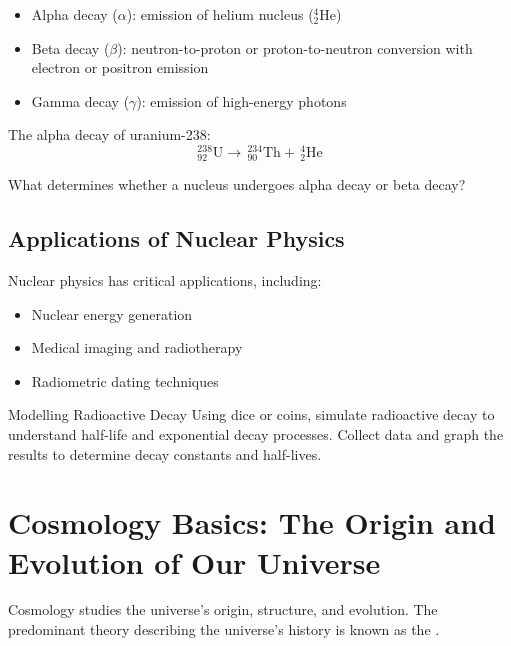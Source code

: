 \begin{itemize}
    \item Alpha decay ($\alpha$): emission of helium nucleus ($^4_2$He)
    \item Beta decay ($\beta$): neutron-to-proton or proton-to-neutron conversion with electron or positron emission
    \item Gamma decay ($\gamma$): emission of high-energy photons
\end{itemize}

\begin{example}
The alpha decay of uranium-238:
\[
^{238}_{92}\text{U}\rightarrow\,^{234}_{90}\text{Th}+\,^{4}_{2}\text{He}
\]
\end{example}

\begin{stopandthink}
What determines whether a nucleus undergoes alpha decay or beta decay?
\end{stopandthink}

\subsection{Applications of Nuclear Physics}
\FloatBarrier

Nuclear physics has critical applications, including:
\begin{itemize}
    \item Nuclear energy generation
    \item Medical imaging and radiotherapy
    \item Radiometric dating techniques
\end{itemize}

\begin{investigation}{Modelling Radioactive Decay}
Using dice or coins, simulate radioactive decay to understand half-life and exponential decay processes. Collect data and graph the results to determine decay constants and half-lives.
\end{investigation}

\FloatBarrier

\section{Cosmology Basics: The Origin and Evolution of Our Universe}
\FloatBarrier

Cosmology studies the universe's origin, structure, and evolution. The predominant theory describing the universe's history is known as the .

